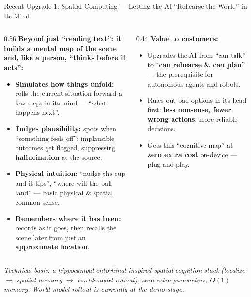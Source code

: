 ﻿\documentclass[aspectratio=169, 10pt]{beamer}
\begin{document}
\begin{frame}{Recent Upgrade 1: Spatial Computing --- Letting the AI ``Rehearse the World'' in Its Mind}
\small
\begin{columns}
\begin{column}{0.56\textwidth}
\textbf{Beyond just ``reading text'': it builds a mental map of the scene and, like a person, ``thinks before it acts'':}
\begin{itemize}\itemsep=0.3em
    \item \textbf{Simulates how things unfold:} rolls the current situation forward a few steps in its mind --- ``what happens next''.
    \item \textbf{Judges plausibility:} spots when ``something feels off''; implausible outcomes get flagged, suppressing \textbf{hallucination} at the source.
    \item \textbf{Physical intuition:} ``nudge the cup and it tips'', ``where will the ball land'' --- basic physical \& spatial common sense.
    \item \textbf{Remembers where it has been:} records as it goes, then recalls the scene later from just an \textbf{approximate location}.
\end{itemize}
\end{column}
\begin{column}{0.44\textwidth}
\textbf{Value to customers:}
\begin{itemize}\itemsep=0.3em
    \item Upgrades the AI from ``can talk'' to ``\textbf{can rehearse \& can plan}'' --- the prerequisite for autonomous agents and robots.
    \item Rules out bad options in its head first: \textbf{less nonsense, fewer wrong actions}, more reliable decisions.
    \item Gets this ``cognitive map'' at \textbf{zero extra cost} on-device --- plug-and-play.
\end{itemize}
\end{column}
\end{columns}
\vspace{0.3em}
{\footnotesize\itshape Technical basis: a hippocampal-entorhinal-inspired spatial-cognition stack (localize $\rightarrow$ spatial memory $\rightarrow$ world-model rollout), zero extra parameters, $O(1)$ memory. World-model rollout is currently at the demo stage.}
\end{frame}
\end{document}
